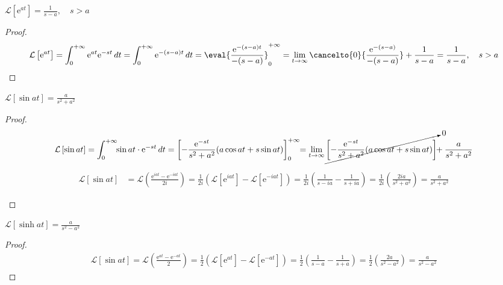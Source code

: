 \begin{mybox3}
\begin{example}
  $ {\mathcal{L}\left[\mathrm{e}^{at}\right] = \frac{1}{s-a}, \quad s > a} $ 
\end{example}
\end{mybox3}
\begin{proof}
  \[
    \mathcal{L}\left[\mathrm{e}^{at}\right] = \int_{0}^{+\infty} \mathrm{e}^{at} 
    \mathrm{e}^{-st} \,{dt} = \int_{0}^{+\infty} \mathrm{e}^{-(s-a)t} \,{dt} =
    \eval{\frac{\mathrm{e}^{-(s-a)t}}{-(s-a)}} _{0}^{+\infty} = 
    \lim_{t \to \infty} \cancelto{0}{\frac{\mathrm{e}^{-(s-a)}}{-(s-a)}}
    + \frac{1}{s-a} = \frac{1}{s-a}, \quad s > a
  \]
\end{proof}

\begin{mybox3}
\begin{example}
  $ \mathcal{L}\left[\sin{at}\right] = \frac{a}{s^{2}+a^{2}} $
\end{example}
\end{mybox3}
\begin{proof}
  \begin{align*}
    \mathcal{L}\left[\sin{at}\right] &= \int_{0}^{+\infty}\!\! \sin{at} \cdot
    \mathrm{e}^{-st} \,{dt} = {\left[- \frac{\mathrm{e}^{-st}}{s^{2}+a^{2}} 
    (a \cos{at} + s \sin{at})\right]} _{0}^{+\infty} \!\!= \lim_{t \to \infty} 
    \cancelto{0}{\left[- \frac{\mathrm{e}^{-st}}{s^{2}+a^{2}} (a \cos{at} + s
    \sin{at})\right]} \!\! + \frac{a}{s^{2}+a^{2}} \\
  \end{align*} 
  \begin{description}[leftmargin=!]
    \item [Β Τρόπος:]
      \begin{align*}
        \mathcal{L}\left[\sin{at}\right] &= \mathcal{L}\left(\frac{\mathrm{e}^{iat} -
        \mathrm{e}^{-iat}}{2i}\right) = \frac{1}{2i} 
        \left(\mathcal{L}[\mathrm{e}^{iat}] - \mathcal{L}[\mathrm{e}^{-iat}]\right) = 
        \frac{1}{2i} \left(\frac{1}{s-ia} - \frac{1}{s+ia}\right) = 
        \frac{1}{2i} \left(\frac{2ia}{s^{2}+a^{2}}\right) = \frac{a}{s^{2}+a^{2}}
      \end{align*}
  \end{description}
\end{proof}

\begin{mybox3}
\begin{example}
  $ \mathcal{L}\left[\sinh{at}\right] = \frac{a}{s^{2}-a^{2}} $
\end{example}
\end{mybox3}
\begin{proof}
  \begin{align*}
    \mathcal{L}\left[\sin{at}\right] = \mathcal{L}\left(\frac{\mathrm{e}^{at} -
    \mathrm{e}^{-at}}{2}\right) = \frac{1}{2} 
    \left(\mathcal{L}[\mathrm{e}^{at}] - \mathcal{L}[\mathrm{e}^{-at}]\right) = 
    \frac{1}{2} \left(\frac{1}{s-a} - \frac{1}{s+a}\right) = 
    \frac{1}{2} \left(\frac{2a}{s^{2}-a^{2}}\right) = \frac{a}{s^{2}-a^{2}}
  \end{align*}
\end{proof}

